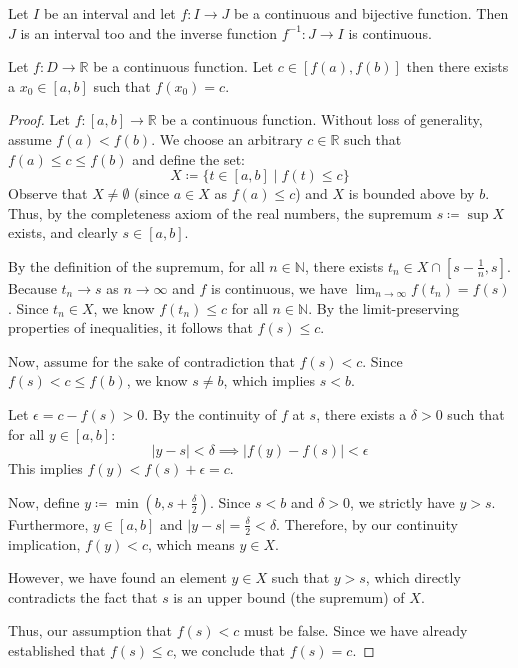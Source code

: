 \begin{theorem}
    Let $I$ be an interval and let $f: I \to J$ be a continuous and bijective function. Then $J$ is an interval too and the inverse function $f^{-1}: J \to I$ is continuous.
\end{theorem}

\begin{theorem}
    Let $f: D \to \mathbb{R}$ be a continuous function. Let $c \in [f(a), f(b)]$ then there exists a $x_0 \in [a, b]$ such that $f(x_0) = c$.
\end{theorem}

\begin{proof}
    Let $f: [a, b] \to \mathbb{R}$ be a continuous function. Without loss of generality, assume $f(a) < f(b)$. We choose an arbitrary $c \in \mathbb{R}$ such that $f(a) \leq c \leq f(b)$ and define the set:
    $$X \coloneqq \{t \in [a, b] \mid f(t) \leq c\}$$
    Observe that $X \neq \emptyset$ (since $a \in X$ as $f(a) \leq c$) and $X$ is bounded above by $b$. Thus, by the completeness axiom of the real numbers, the supremum $s \coloneqq \sup X$ exists, and clearly $s \in [a, b]$.

    By the definition of the supremum, for all $n \in \mathbb{N}$, there exists $t_n \in X \cap [s - \frac{1}{n}, s]$. 
    Because $t_n \to s$ as $n \to \infty$ and $f$ is continuous, we have $\lim_{n\to\infty} f(t_n) = f(s)$. 
    Since $t_n \in X$, we know $f(t_n) \leq c$ for all $n \in \mathbb{N}$. By the limit-preserving properties of inequalities, it follows that $f(s) \leq c$.

    Now, assume for the sake of contradiction that $f(s) < c$. 
    Since $f(s) < c \leq f(b)$, we know $s \neq b$, which implies $s < b$. 

    Let $\epsilon = c - f(s) > 0$. By the continuity of $f$ at $s$, there exists a $\delta > 0$ such that for all $y \in [a, b]$:
    $$|y - s| < \delta \implies |f(y) - f(s)| < \epsilon$$
    This implies $f(y) < f(s) + \epsilon = c$. 

    Now, define $y \coloneqq \min(b, s + \frac{\delta}{2})$. 
    Since $s < b$ and $\delta > 0$, we strictly have $y > s$. Furthermore, $y \in [a, b]$ and $|y - s| = \frac{\delta}{2} < \delta$. 
    Therefore, by our continuity implication, $f(y) < c$, which means $y \in X$. 

    However, we have found an element $y \in X$ such that $y > s$, which directly contradicts the fact that $s$ is an upper bound (the supremum) of $X$. 

    Thus, our assumption that $f(s) < c$ must be false. Since we have already established that $f(s) \leq c$, we conclude that $f(s) = c$.
\end{proof}


